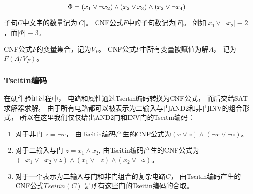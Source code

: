 \begin{equation}\label{eqn_phi}
\centering \Phi=(x_1\vee \neg x_2)
\wedge(x_2\vee x_3)
\wedge(x_2\vee \neg x_4)
\end{equation}

子句$C$中文字的数量记为$|C|$。
CNF公式$F$中的子句数记为$|F|$。
例如$| x_1\vee  \neg x_2 |\equiv 2$，而$|\Phi|\equiv 3$。

CNF公式$F$的变量集合，记为$V_{F}$。
CNF公式$F$中所有变量被赋值为解$A$，
记为$F(A/V_{F})$。


\subsubsection{Tseitin编码}
在硬件验证过程中，
电路和属性通过Tseitin编码转换为CNF公式，
而后交给SAT求解器求解。
由于所有电路都可以被表示为二输入与门AND2和非门INV的组合形式，
所以在这里我们仅仅给出AND2门和INV门的Tseitin编码：

\begin{enumerate}
\item 对于非门 $z=\neg x$，
由Tseitin编码产生的CNF公式为$(x\vee z)\wedge( \neg x\vee \neg z)$。
\item 对于二输入与门 $z=x_1\wedge x_2$,
由Tseitin编码产生的CNF公式为$( \neg x_1\vee \neg x_2\vee z)\wedge(x_1\vee \neg z) \wedge(x_2\vee \neg z)$。
\item 对于一个表示为二输入与门和非门组合的复杂电路$C$，
由Tseitin编码产生的CNF公式$Tseitin(C)$ 是所有这些门的Tseitin编码的合取。
\end{enumerate}

